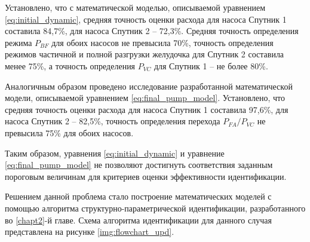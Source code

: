 Установлено, что с математической моделью, описываемой уравнением \eqref{eq:initial_dynamic}, средняя точность оценки расхода для насоса Спутник 1 составила 84,7\%, для насоса Спутник 2 -- 72,3\%. Средняя точность определения режима $P_{BF}$ для обоих насосов не превысила 70\%, точность определения режимов частичной и полной разгрузки желудочка для Спутник 2 составила менее 75\%, а точность определения $P_{VC}$ для Спутник 1 -- не более 80\%. 

Аналогичным образом проведено исследование разработанной математической модели, описываемой уравнением \eqref{eq:final_pump_model}. Установлено, что средняя точность оценки расхода для насоса Спутник 1 составила 97,6\%, для насоса Спутник 2 -- 82,5\%, точность определения перехода $P_{FA}/P_{VC}$ не превысила 75\% для обоих насосов. 


Таким образом, уравнения \eqref{eq:initial_dynamic} и уравнение \eqref{eq:final_pump_model} не позволяют достигнуть соответствия заданным пороговым величинам для критериев оценки эффективности идентификации. %


Решением данной проблема стало построение математических моделей с помощью алгоритма структурно-параметрической идентификации, разработанного во \ref{chapt2}-й главе. Схема алгоритма идентификации для данного случая представлена на рисунке \ref{img:flowchart_upd}. 




